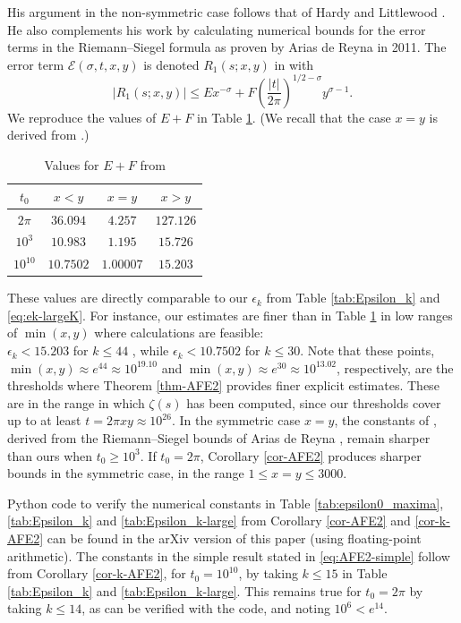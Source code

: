 \documentclass[11pt,letterpaper,oneside,reqno]{amsart}
\renewcommand{\^}[1]{\widehat{#1}}
\newcommand{\s}{\sigma}
\numberwithin{equation}{section}
\theoremstyle{remark}
\begin{document}
His argument in the non-symmetric case follows that of Hardy and Littlewood \cite[Theorem A]{HL1923}.
%
He also complements his work by calculating numerical bounds for the error terms in the Riemann--Siegel formula as proven by Arias de Reyna \cite[Theorems 4.1 and 4.2]{AriasDeReyna2011} in 2011.  
The error term $\mathcal{E}(\sigma,t,x,y)$ is denoted $R_1(s;x,y)$ in \cite{Simonic2020} with
\[
|R_1(s;x,y)| \le E x^{-\sigma} + F \left(\frac{|t|}{2\pi}\right)^{1/2-\sigma} y^{\s-1}. 
\]
We reproduce the values of $E+F$ in Table \ref{tab:EF_comp}. (We recall that the case $x=y$ is derived from \cite{AriasDeReyna2011}.)
\begin{table}[ht]
\centering
\caption{Values for $E+F$ from \cite[Tables 2--4]{Simonic2020} }
\label{tab:EF_comp}
\renewcommand{\arraystretch}{1.25}
\begin{tabular}{|c|c|c|c|}
\hline
$t_0$ & $x<y$ & $x=y$ & $x>y$ \\ 
\hline
$2\pi$    & $36.094$  & $4.257$   & $127.126$ \\
$10^3$    & $10.983$  & $1.195$   & $15.726$  \\
$10^{10}$ & $10.7502$ & $1.00007$ & $15.203$  \\ 
\hline
\end{tabular}
\end{table}

These values are directly comparable to our $\epsilon_k$ from Table \ref{tab:Epsilon_k} and \eqref{eq:ek-largeK}.
For instance, our estimates are finer than \cite{Simonic2020} in Table \ref{tab:EF_comp} in low ranges of $\min(x,y)$ where calculations are feasible:\\
$\epsilon_k < 15.203$ for $k\le 44$ , while $\epsilon_k < 10.7502$ for $k\le 30$.
Note that these points, $\min(x,y) \approx e^{44} \approx 10^{19.10}$ and $\min(x,y) \approx e^{30} \approx 10^{13.02}$, respectively, are the thresholds where Theorem \ref{thm-AFE2} provides finer explicit estimates. These are in the range in which $\zeta(s)$ has been computed, since our thresholds cover up to at least $t=2\pi xy \approx 10^{26}$.
%
In the symmetric case $x=y$, the constants of \cite{Simonic2020}, derived from
the Riemann--Siegel bounds of Arias de Reyna \cite[Theorems 4.1 and
4.2]{AriasDeReyna2011}, remain sharper than ours when $t_0\ge 10^3$. If $t_0=2\pi$, Corollary \ref{cor-AFE2} produces sharper bounds in the symmetric case, in the range $1\le x=y\le 3000.$
\smallskip 

Python code to verify the numerical constants in Table \ref{tab:epsilon0_maxima}, \ref{tab:Epsilon_k} and \ref{tab:Epsilon_k-large} from Corollary \ref{cor-AFE2} and \ref{cor-k-AFE2} can be found in the arXiv version of this paper (using floating-point arithmetic). 
The constants in the simple result stated in \eqref{eq:AFE2-simple} follow from Corollary \ref{cor-k-AFE2}, for $t_0=10^{10}$, by taking $k\le 15$ in Table \ref{tab:Epsilon_k} and \ref{tab:Epsilon_k-large}. This remains true for $t_0=2\pi$ by taking $k\le 14$, as can be verified with the code, and noting $10^6<e^{14}$.
\end{document}
